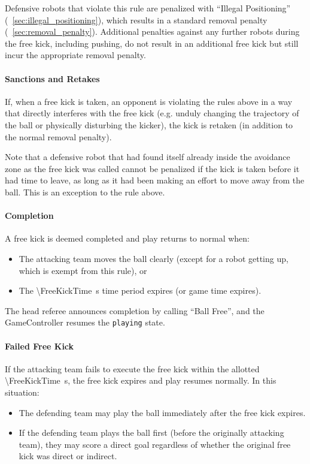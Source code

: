 Defensive robots that violate this rule are penalized with ``Illegal Positioning'' (\cf~\cref{sec:illegal_positioning}), which results in a standard removal penalty (\cf~\cref{sec:removal_penalty}).
Additional penalties against any further robots during the free kick, including pushing, do not result in an additional free kick but still incur the appropriate removal penalty.

\paragraph{Sanctions and Retakes}
If, when a free kick is taken, an opponent is violating the rules above in a way that directly interferes with the free kick (e.g. unduly changing the trajectory of the ball or physically disturbing the kicker), the kick is retaken (in addition to the normal removal penalty).

Note that a defensive robot that had found itself already inside the avoidance zone as the free kick was called cannot be penalized if the kick is taken before it had time to leave, as long as it had been making an effort to move away from the ball. This is an exception to the rule above.

\paragraph{Completion}

A free kick is deemed completed and play returns to normal when:
\begin{itemize}
  \item The attacking team moves the ball clearly (except for a robot getting up, which is exempt from this rule), or
  \item The \qty{\FreeKickTime}{\second} time period expires (or game time expires).
\end{itemize}

The head referee announces completion by calling ``Ball Free'', and the GameController resumes the \texttt{playing} state.

\paragraph{Failed Free Kick}

If the attacking team fails to execute the free kick within the allotted \qty{\FreeKickTime}{\second}, the free kick expires and play resumes normally.
In this situation:
\begin{itemize}
  \item The defending team may play the ball immediately after the free kick expires.
  \item If the defending team plays the ball first (before the originally attacking team), they may score a direct goal regardless of whether the original free kick was direct or indirect.
\end{itemize}

